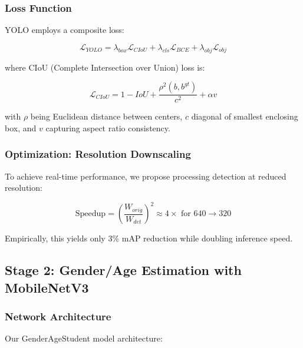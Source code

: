 \documentclass[12pt,a4paper]{article}
\begin{document}
\subsubsection{Loss Function}

YOLO employs a composite loss:

\begin{equation}
    \mathcal{L}_{YOLO} = \lambda_{box} \mathcal{L}_{CIoU} + \lambda_{cls} \mathcal{L}_{BCE} + \lambda_{obj} \mathcal{L}_{obj}
\end{equation}

where CIoU (Complete Intersection over Union) loss is:

\begin{equation}
    \mathcal{L}_{CIoU} = 1 - IoU + \frac{\rho^2(b, b^{gt})}{c^2} + \alpha v
\end{equation}

with $\rho$ being Euclidean distance between centers, $c$ diagonal of smallest enclosing box, and $v$ capturing aspect ratio consistency.

\subsubsection{Optimization: Resolution Downscaling}

To achieve real-time performance, we propose processing detection at reduced resolution:

\begin{equation}
    \text{Speedup} = \left(\frac{W_{orig}}{W_{det}}\right)^2 \approx 4\times \text{ for } 640 \rightarrow 320
\end{equation}

Empirically, this yields only 3\% mAP reduction while doubling inference speed.

\subsection{Stage 2: Gender/Age Estimation with MobileNetV3}

\subsubsection{Network Architecture}

Our GenderAgeStudent model architecture:
\end{document}
